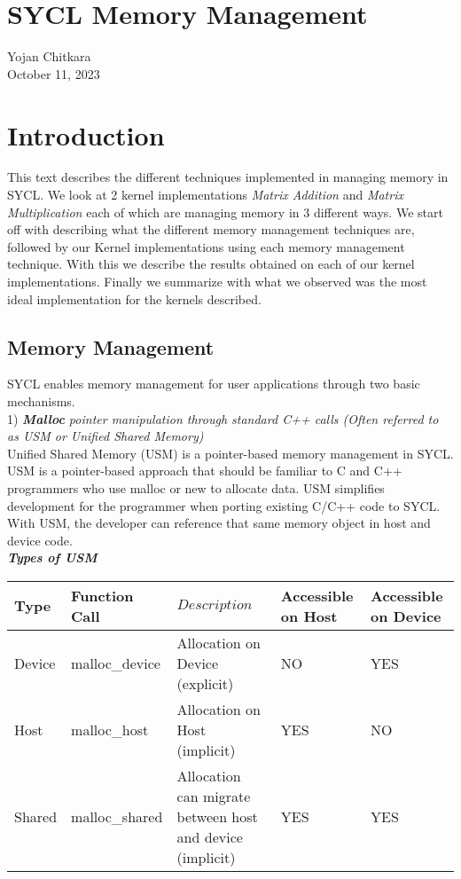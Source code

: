 \documentclass[14pt,fleqn]{article}
\begin{document}
\section{SYCL Memory Management}
Yojan Chitkara\\
October 11, 2023


\section{Introduction}
This text describes the different techniques implemented in managing memory in SYCL. We look at 2 kernel implementations \textit{Matrix Addition} and \textit{Matrix Multiplication} each of which are managing memory in 3 different ways. We start off with describing what the different memory management techniques are, followed by our Kernel implementations using each memory management technique. With this we describe the results obtained on each of our kernel implementations. Finally we summarize with what we observed was the most ideal implementation for the kernels described.
\vspace{10pt}

\subsection{Memory Management}
SYCL enables memory management for user applications through two basic mechanisms. \\

1) \textit{\textbf{Malloc} pointer manipulation through standard C++ calls (Often referred to as USM or Unified Shared Memory)}\\

Unified Shared Memory (USM) is a pointer-based memory management in SYCL. USM is a pointer-based approach that should be familiar to C and C++ programmers who use malloc or new to allocate data. USM simplifies development for the programmer when porting existing C/C++ code to SYCL. With USM, the developer can reference that same memory object in host and device code.\\

\textbf{\textit{Types of USM}} \\

\begin{tabular}{|l|l|l|l|l|}                                   
    \hline\hline         
    Type  & Function Call & $Description$ & Accessible on Host & Accessible on Device \\
    \hline\hline
    Device & malloc\_device & Allocation on Device (explicit) & NO & YES \\ \hline
    Host & malloc\_host & Allocation on Host (implicit) & YES & NO \\ \hline
    Shared & malloc\_shared & Allocation can migrate between host and device (implicit) & YES & YES \\ \hline

\end{tabular}
\newline\newline
\end{document}
